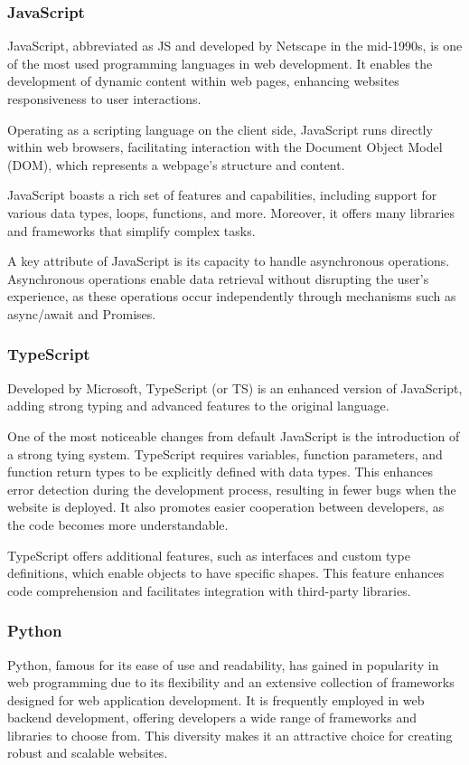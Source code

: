 \documentclass[12pt,oneside,openright,a4paper]{cpe-english-project}
\begin{document}
    \subsubsection{JavaScript}
      \qquad JavaScript, abbreviated as JS and developed by Netscape in the mid-1990s, is one of the most used programming languages in web development. It enables the development of dynamic content within web pages, enhancing websites responsiveness to user interactions.\par
      \qquad Operating as a scripting language on the client side, JavaScript runs directly within web browsers, facilitating interaction with the Document Object Model (DOM), which represents a webpage's structure and content.\par
      \qquad JavaScript boasts a rich set of features and capabilities, including support for various data types, loops, functions, and more. Moreover, it offers many libraries and frameworks that simplify complex tasks.\par
      \qquad A key attribute of JavaScript is its capacity to handle asynchronous operations. Asynchronous operations enable data retrieval without disrupting the user’s experience, as these operations occur independently through mechanisms such as async/await and Promises.\par
    \subsubsection{TypeScript}
      \qquad Developed by Microsoft, TypeScript (or TS) is an enhanced version of JavaScript, adding strong typing and advanced features to the original language.\par
      \qquad One of the most noticeable changes from default JavaScript is the introduction of a strong tying system. TypeScript requires variables, function parameters, and function return types to be explicitly defined with data types. This enhances error detection during the development process, resulting in fewer bugs when the website is deployed. It also promotes easier cooperation between developers, as the code becomes more understandable.\par
      \qquad TypeScript offers additional features, such as interfaces and custom type definitions, which enable objects to have specific shapes. This feature enhances code comprehension and facilitates integration with third-party libraries.\par
    
    \subsubsection{Python}
      \qquad Python, famous for its ease of use and readability, has gained in popularity in web programming due to its flexibility and an extensive collection of frameworks designed for web application development. It is frequently employed in web backend development, offering developers a wide range of frameworks and libraries to choose from. This diversity makes it an attractive choice for creating robust and scalable websites.\par
\end{document}
